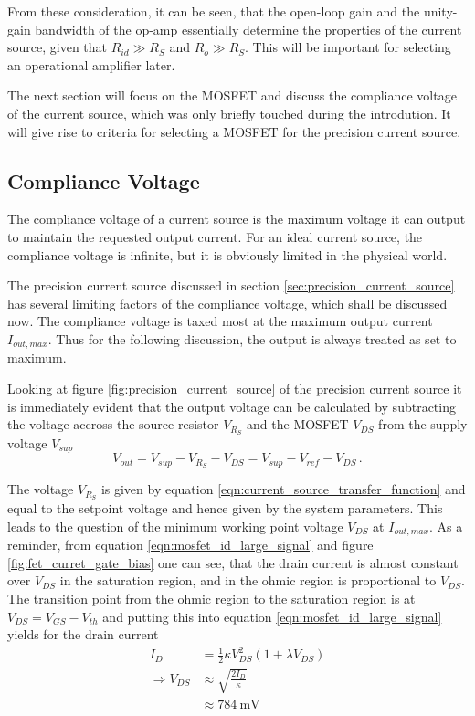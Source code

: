 From these consideration, it can be seen, that the open-loop gain and the unity-gain bandwidth of the op-amp essentially determine the properties of the current source, given that $R_{id} \gg R_S$ and $R_o \gg R_S$. This will be important for selecting an operational amplifier later.

The next section will focus on the MOSFET and discuss the compliance voltage of the current source, which was only briefly touched during the introdution. It will give rise to criteria for selecting a MOSFET for the precision current source.

\clearpage
\subsection{Compliance Voltage}%
\label{sec:compliance_voltage}
The compliance voltage of a current source is the maximum voltage it can output to maintain the requested output current. For an ideal current source, the compliance voltage is infinite, but it is obviously limited in the physical world.

The precision current source discussed in section \ref{sec:precision_current_source} has several limiting factors of the compliance voltage, which shall be discussed now. The compliance voltage is taxed most at the maximum output current $I_{out,max}$. Thus for the following discussion, the output is always treated as set to maximum.

Looking at figure \ref{fig:precision_current_source} of the precision current source it is immediately evident that the output voltage can be calculated by subtracting the voltage accross the source resistor $V_{R_S}$ and the MOSFET $V_{DS}$ from the supply voltage $V_{sup}$
\begin{equation*}
    V_{out} = V_{sup} - V_{R_S} - V_{DS} = V_{sup} - V_{ref} - V_{DS}\,.
\end{equation*}

The voltage $V_{R_S}$ is given by equation \ref{eqn:current_source_transfer_function} and equal to the setpoint voltage and hence given by the system parameters. This leads to the question of the minimum working point voltage $V_{DS}$ at $I_{out,max}$. As a reminder, from equation \ref{eqn:mosfet_id_large_signal} and figure \ref{fig:fet_curret_gate_bias} one can see, that the drain current is almost constant over $V_{DS}$ in the saturation region, and in the ohmic region is proportional to $V_{DS}$. The transition point from the ohmic region to the saturation region is at $V_{DS} = V_{GS} - V_{th}$ and putting this into equation \ref{eqn:mosfet_id_large_signal} yields for the drain current
\begin{align}
    I_D &= \frac{1}{2} \kappa V_{DS}^2 \left(1+ \lambda V_{DS}\right) \nonumber\\
    \Rightarrow V_{DS} &\approx \sqrt{\frac{2 I_D}{\kappa}}\\
    &\approx \qty{784}{\mV}
\end{align}

